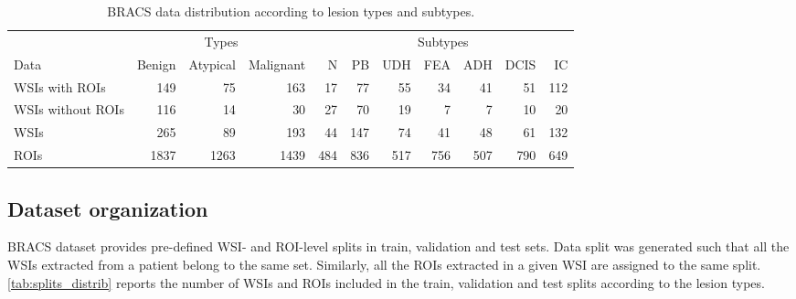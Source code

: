 \documentclass[
11pt, %
english, %
singlespacing, %
headsepline, %
]{project_structure}
\begin{document}
\begin{table}[ht]
    \centering
    \small
    \begin{adjustbox}{max width=\textwidth} %
        \begin{tabular}{@{}l|rrr|rrrrrrr@{}}
            \toprule
            & \multicolumn{3}{c|}{Types} & \multicolumn{7}{c}{Subtypes} \\
            \cmidrule(l){2-4} \cmidrule(l){5-11}
            Data & Benign & Atypical & Malignant & \acrshort{N} & \acrshort{PB} & \acrshort{UDH} & \acrshort{FEA} & \acrshort{ADH} & \acrshort{DCIS} & \acrshort{IC} \\
            \midrule
            \acrshort{WSI}s with \acrshort{ROI}s & 149 & 75 & 163 & 17 & 77 & 55 & 34 & 41 & 51 & 112 \\
            \acrshort{WSI}s without \acrshort{ROI}s & 116 & 14 & 30 & 27 & 70 & 19 & 7 & 7 & 10 & 20 \\
            \acrshort{WSI}s & 265 & 89 & 193 & 44 & 147 & 74 & 41 & 48 & 61 & 132 \\
            \acrshort{ROI}s & 1837 & 1263 & 1439 & 484 & 836 & 517 & 756 & 507 & 790 & 649 \\
            \bottomrule
        \end{tabular}
    \end{adjustbox}
    \caption{\acrshort{BRACS} data distribution according to lesion types and subtypes.}
    \label{tab:data_distribution}
\end{table}

\subsection{Dataset organization}
\acrshort{BRACS} dataset provides pre-defined \acrshort{WSI}- and \acrshort{ROI}-level splits in train, validation and test sets. Data split was generated such that all the \acrshort{WSI}s extracted from a patient belong to the same set. Similarly, all the \acrshort{ROI}s extracted in a given \acrshort{WSI} are assigned to the same split.  \autoref{tab:splits_distrib} reports the number of \acrshort{WSI}s and \acrshort{ROI}s included in the train, validation and test splits according to the lesion types.
\end{document}
